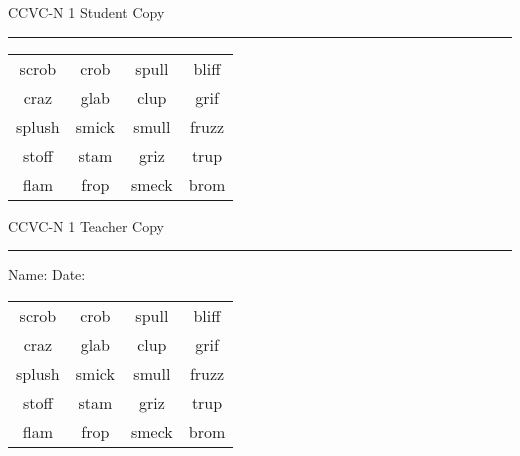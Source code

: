 \documentclass{memoir}
\begin{document}

\footnotesize \noindent
CCVC-N 1 \hfill Student Copy
\smallskip
\hrule

\Large

\setlength{\tabcolsep}{14pt}
\def\arraystretch{3}

{\selectfont


\begin{vplace}[0.5]
\begin{center}
\begin{tabular}{cccc}
scrob & crob & spull & bliff \\
craz       & glab & clup & grif      \\
splush & smick & smull & fruzz \\
stoff & stam            & griz & trup       \\
flam             & frop & smeck & brom          \\
\end{tabular}
\end{center}
\end{vplace}

}

\newpage

\footnotesize \noindent
CCVC-N 1 \hfill Teacher Copy
\smallskip
\hrule

\small

\vfill

\noindent
Name: \underline{\hspace{1.75in}} \hfill Date: \underline{\hspace{1in}}

\Large

{\selectfont


\begin{vplace}[0.5]
\begin{center}
\begin{tabular}{cccc}
scrob & crob & spull & bliff \\
craz       & glab & clup & grif      \\
splush & smick & smull & fruzz \\
stoff & stam            & griz & trup       \\
flam             & frop & smeck & brom          \\
\end{tabular}
\end{center}
\end{vplace}



}
\end{document}
